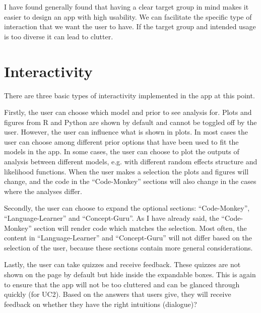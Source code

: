 \documentclass[12pt]{article}
\begin{document}
I have found generally found that having a clear target group in mind makes it easier to design an app with high usability. We can facilitate the specific type of interaction that we want the user to have. If the target group and intended usage is too diverse it can lead to clutter.

\section{Interactivity}
There are three basic types of interactivity implemented in the app at this point.

Firstly, the user can choose which model and prior to see analysis for.
Plots and figures from R and Python are shown by default and cannot be toggled off by the user.
However, the user can influence what is shown in plots. In most cases the user can choose
among different prior options that have been used to fit the models in the app.
In some cases, the user can choose to plot the outputs of analysis between different models,
e.g. with different random effects structure and likelihood functions.
When the user makes a selection the plots and figures will change,
and the code in the “Code-Monkey” sections will also change in the cases where the analyses differ.

Secondly, the user can choose to expand the optional sections:
“Code-Monkey”, “Language-Learner” and “Concept-Guru”.
As I have already said, the “Code-Monkey” section will render code which matches the selection.
Most often, the content in “Language-Learner” and “Concept-Guru” will not differ
based on the selection of the user, because these sections contain more general considerations.

Lastly, the user can take quizzes and receive feedback.
These quizzes are not shown on the page by default but hide inside the expandable boxes.
This is again to ensure that the app will not be too cluttered and can be glanced
through quickly (for UC2). Based on the answers that users give, they will receive
feedback on whether they have the right intuitions (dialogue)?
\end{document}
